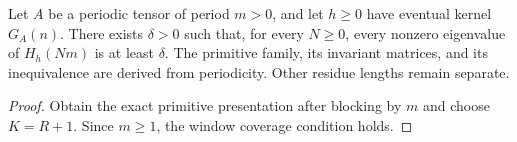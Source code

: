 \begin{lemma}
    \label{thm:periodic_tensor_aligned_uniform_gap}
    \leanok
    Let $A$ be a periodic tensor of period $m>0$, and let $h\geq0$
    have eventual kernel $G_A(n)$.
    There exists $\delta>0$ such that, for every $N\geq0$, every nonzero
    eigenvalue of $H_h(Nm)$ is at least $\delta$.
    The primitive family, its invariant matrices, and its inequivalence
    are derived from periodicity. Other residue lengths remain separate.
\end{lemma}
\begin{proof}\leanok
    Obtain the exact primitive presentation after blocking by $m$ and
    choose $K=R+1$. Since $m\geq1$, the window coverage condition holds.
\end{proof}

